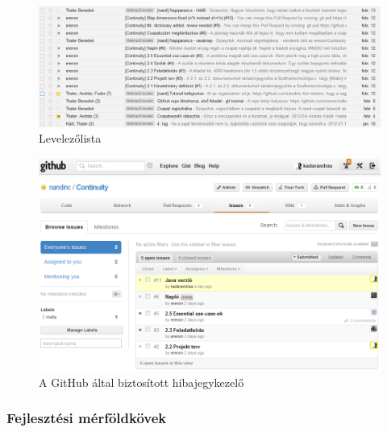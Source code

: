 	\begin{figure}[h]
		\begin{center}
			\includegraphics[scale=0.5]{resources/levlista.png}
			\caption{Levelezőlista}
		\end{center}
	\end{figure}
	
	\begin{figure}[h]
		\begin{center}
			\includegraphics[scale=0.5]{resources/issues.png}
			\caption{A GitHub által biztosított hibajegykezelő}
		\end{center}
	\end{figure}

    \subsubsection{Fejlesztési mérföldkövek}

